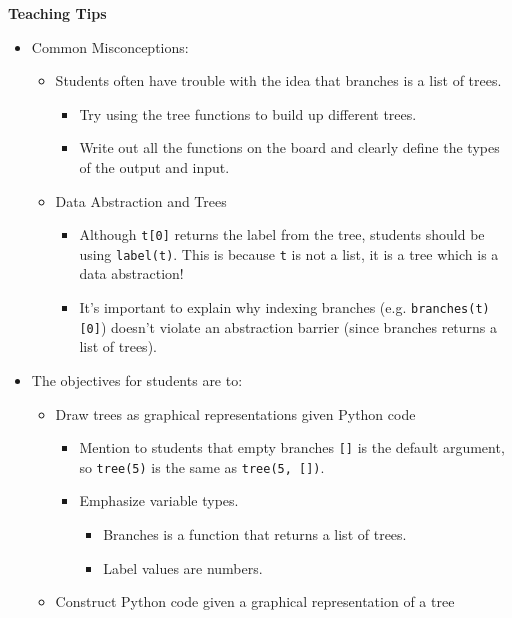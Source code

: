 \begin{guide}
	\begin{blocksection}
	\textbf{Teaching Tips}
	\begin{itemize}
			\item Common Misconceptions:
			\begin{itemize}
				\item Students often have trouble with the idea that branches is a list of trees.
				\begin{itemize}
					\item Try using the tree functions to build up different trees.
					\item Write out all the functions on the board and clearly define the types of the output and input.
				\end{itemize}
				\item Data Abstraction and Trees
				\begin{itemize}
					\item Although \lstinline{t[0]} returns the label from the tree, students should be using \lstinline{label(t)}. This is because \lstinline{t} is not a list, it is a tree which is a data abstraction!
					\item It’s important to explain why indexing branches (e.g. \lstinline{branches(t)[0]}) doesn't violate an abstraction barrier (since branches returns a list of trees).
				\end{itemize}
			\end{itemize}
			\item The objectives for students are to:
			\begin{itemize}
				\item Draw trees as graphical representations given Python code
				\begin{itemize}
					\item Mention to students that empty branches \lstinline{[]} is the default argument, so \lstinline{tree(5)} is the same as \lstinline{tree(5, [])}.
					\item Emphasize variable types.
					\begin{itemize}
						\item Branches is a function that returns a list of trees.
						\item Label values are numbers.
					\end{itemize}
				\end{itemize}
				\item Construct Python code given a graphical representation of a tree
			\end{itemize}
	\end{itemize}
	\end{blocksection}
\end{guide}
